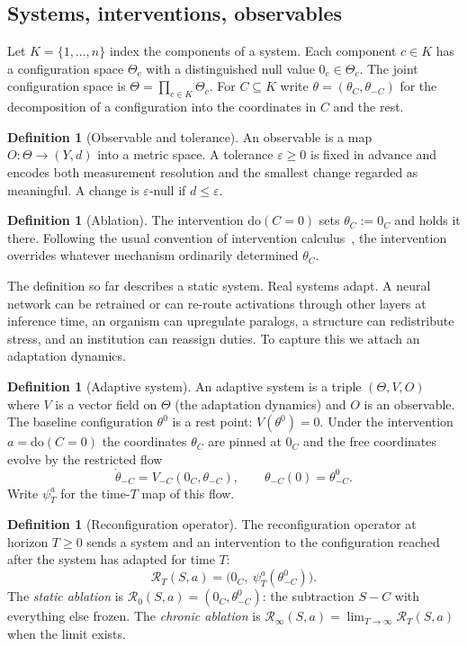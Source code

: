 \documentclass[11pt]{article}
\theoremstyle{definition}
\newtheorem{definition}[theorem]{Definition}
\theoremstyle{remark}
\newcommand{\Rop}{\mathcal{R}}
\newcommand{\dox}[1]{\mathrm{do}(#1)}
\begin{document}
\subsection{Systems, interventions, observables}

Let $K=\{1,\dots,n\}$ index the components of a system. Each component $c\in K$ has a configuration space $\Theta_c$ with a distinguished null value $0_c\in\Theta_c$. The joint configuration space is $\Theta=\prod_{c\in K}\Theta_c$. For $C\subseteq K$ write $\theta=(\theta_C,\theta_{-C})$ for the decomposition of a configuration into the coordinates in $C$ and the rest.

\begin{definition}[Observable and tolerance]
An observable is a map $O:\Theta\to(Y,d)$ into a metric space. A tolerance $\varepsilon\ge 0$ is fixed in advance and encodes both measurement resolution and the smallest change regarded as meaningful. A change is $\varepsilon$-null if $d\le\varepsilon$.
\end{definition}

\begin{definition}[Ablation]
The intervention $\dox{C=0}$ sets $\theta_C:=0_C$ and holds it there. Following the usual convention of intervention calculus~\cite{pearl2009}, the intervention overrides whatever mechanism ordinarily determined $\theta_C$.
\end{definition}

The definition so far describes a static system. Real systems adapt. A neural network can be retrained or can re-route activations through other layers at inference time, an organism can upregulate paralogs, a structure can redistribute stress, and an institution can reassign duties. To capture this we attach an adaptation dynamics.

\begin{definition}[Adaptive system]\label{def:adaptive}
An adaptive system is a triple $(\Theta,V,O)$ where $V$ is a vector field on $\Theta$ (the adaptation dynamics) and $O$ is an observable. The baseline configuration $\theta^0$ is a rest point: $V(\theta^0)=0$. Under the intervention $a=\dox{C=0}$ the coordinates $\theta_C$ are pinned at $0_C$ and the free coordinates evolve by the restricted flow
\[
\dot\theta_{-C}=V_{-C}(0_C,\theta_{-C}),\qquad \theta_{-C}(0)=\theta^0_{-C}.
\]
Write $\psi^a_T$ for the time-$T$ map of this flow.
\end{definition}

\begin{definition}[Reconfiguration operator]\label{def:recon}
The reconfiguration operator at horizon $T\ge 0$ sends a system and an intervention to the configuration reached after the system has adapted for time $T$:
\[
\Rop_T(S,a)=\bigl(0_C,\ \psi^a_T(\theta^0_{-C})\bigr).
\]
The \emph{static ablation} is $\Rop_0(S,a)=(0_C,\theta^0_{-C})$: the subtraction $S-C$ with everything else frozen. The \emph{chronic ablation} is $\Rop_\infty(S,a)=\lim_{T\to\infty}\Rop_T(S,a)$ when the limit exists.
\end{definition}
\end{document}
